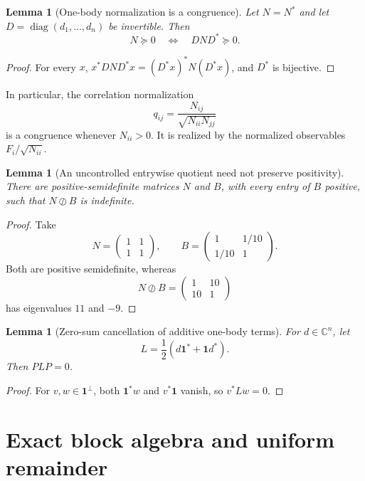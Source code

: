 \documentclass[11pt]{article}
\newtheorem{lemma}[theorem]{Lemma}
\newcommand{\one}{\mathbf 1}
\newcommand{\C}{\mathbb C}
\newcommand{\diag}{\operatorname{diag}}
\newcommand{\odiv}{\oslash}
\begin{document}
\begin{lemma}[One-body normalization is a congruence]
Let $N=N^*$ and let $D=\diag(d_1,\ldots,d_n)$ be invertible.  Then
\[
  N\succeq0
  \quad\Longleftrightarrow\quad
  DND^*\succeq0.
\]
\end{lemma}

\begin{proof}
For every $x$, $x^*DND^*x=(D^*x)^*N(D^*x)$, and $D^*$ is bijective.
\end{proof}

In particular, the correlation normalization
\[
  q_{ij}=\frac{N_{ij}}{\sqrt{N_{ii}N_{jj}}}
\]
is a congruence whenever $N_{ii}>0$.  It is realized by the normalized observables $F_i/\sqrt{N_{ii}}$.

\begin{lemma}[An uncontrolled entrywise quotient need not preserve positivity]
There are positive-semidefinite matrices $N$ and $B$, with every entry of $B$ positive, such that $N\odiv B$ is indefinite.
\end{lemma}

\begin{proof}
Take
\[
  N=\begin{pmatrix}1&1\\1&1\end{pmatrix},
  \qquad
  B=\begin{pmatrix}1&1/10\\1/10&1\end{pmatrix}.
\]
Both are positive semidefinite, whereas
\[
  N\odiv B=\begin{pmatrix}1&10\\10&1\end{pmatrix}
\]
has eigenvalues $11$ and $-9$.
\end{proof}

\begin{lemma}[Zero-sum cancellation of additive one-body terms]
For $d\in\C^n$, let
\[
  L=\frac12(d\one^*+\one d^*).
\]
Then $PLP=0$.
\end{lemma}

\begin{proof}
For $v,w\in\one^\perp$, both $\one^*w$ and $v^*\one$ vanish, so $v^*Lw=0$.
\end{proof}

\section{Exact block algebra and uniform remainder}
\label{app:uniform-remainder}
\end{document}
